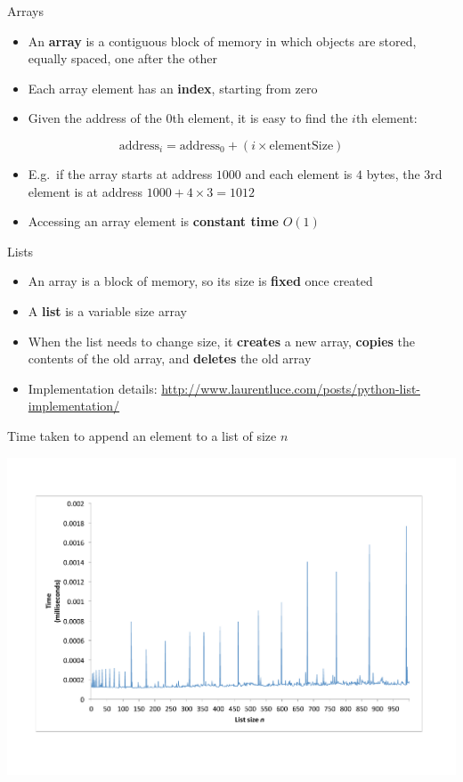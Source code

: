 \begin{frame}{Arrays}
	\begin{itemize}
		\pause\item An \textbf{array} is a contiguous block of memory in which objects are stored,
			equally spaced, one after the other
		\pause\item Each array element has an \textbf{index}, starting from zero
		\pause\item Given the address of the $0$th element, it is easy to find the $i$th element:
	\end{itemize}
	$$ \text{address}_i = \text{address}_0 + (i \times \text{elementSize}) $$
	\begin{itemize}
		\pause\item E.g.\ if the array starts at address $1000$ and each element is $4$ bytes,
			the 3rd element is at address $1000 + 4 \times 3 = 1012$
		\pause\item Accessing an array element is \textbf{constant time} $O(1)$
	\end{itemize}
\end{frame}

\begin{frame}{Lists}
	\begin{itemize}
		\pause\item An array is a block of memory, so its size is \textbf{fixed} once created
		\pause\item A \textbf{list} is a variable size array
		\pause\item When the list needs to change size, it \textbf{creates} a new array,
			\textbf{copies} the contents of the old array, and \textbf{deletes} the old array
		\pause\item Implementation details: \url{http://www.laurentluce.com/posts/python-list-implementation/}
	\end{itemize}
\end{frame}

\begin{frame}{Time taken to append an element to a list of size $n$}
	\begin{center}
		\vspace{-5ex}
		\includegraphics[height=0.9\textheight]{list_append_timing}
	\end{center}
\end{frame}

